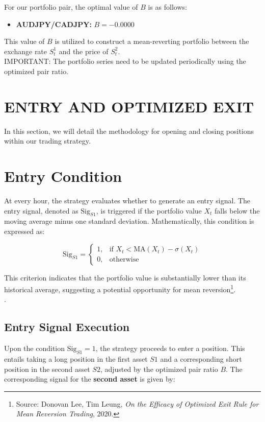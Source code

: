 \documentclass{article}
\begin{document}
For our portfolio pair, the optimal value of \( B \) is as follows:
\begin{itemize}
    \item \textbf{AUDJPY/CADJPY:} \( B = -0.0000 \)
\end{itemize}

This value of \( B \) is utilized to construct a mean-reverting portfolio between the exchange rate \( S_t^1 \) and the price of \( S_t^2 \).\\



IMPORTANT: The portfolio series need to be updated periodically using the optimized pair ratio.

\section{ENTRY AND OPTIMIZED EXIT}
In this section, we will detail the methodology for opening and closing positions within our trading strategy.
\section*{Entry Condition}

At every hour, the strategy evaluates whether to generate an entry signal. The entry signal, denoted as \( \text{Sig}_{S1} \), is triggered if the portfolio value \( X_t \) falls below the moving average minus one standard deviation. Mathematically, this condition is expressed as:

\[
\text{Sig}_{S1} = 
\begin{cases} 
1, & \text{if } X_t < \text{MA}(X_t) - \sigma(X_t) \\
0, & \text{otherwise}
\end{cases}
\]

This criterion indicates that the portfolio value is substantially lower than its historical average, suggesting a potential opportunity for mean reversion\footnote{Source: Donovan Lee, Tim Leung, \textit{On the Efficacy of Optimized Exit Rule for Mean Reversion Trading}, 2020.}.\\.


\subsection*{Entry Signal Execution}
Upon the condition \( \text{Sig}_{S1} = 1 \), the strategy proceeds to enter a position. This entails taking a long position in the first asset \( S1 \) and a corresponding short position in the second asset \( S2 \), adjusted by the optimized pair ratio \( B \). The corresponding signal for the \textbf{second asset} is given by:
\end{document}
